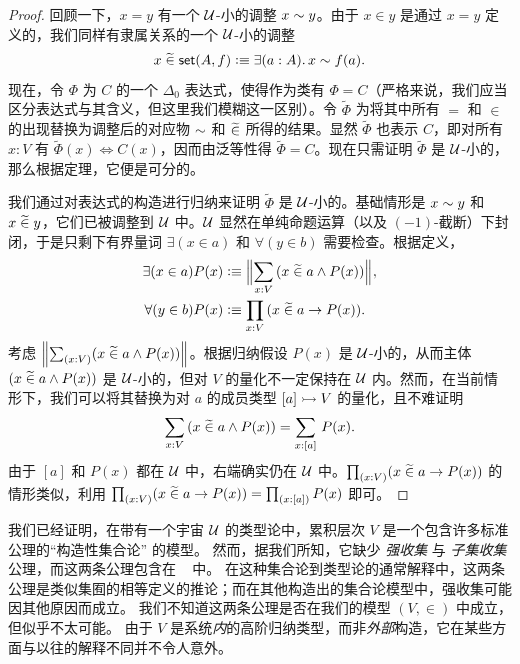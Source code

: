 \begin{proof}
回顾一下，$x = y$ 有一个 $\mathcal{U}$-小的调整 $x \sim y$。由于 $x\in y$ 是通过 $x=y$ 定义的，我们同样有隶属关系的一个 $\mathcal{U}$-小的调整
%
\begin{equation*}
  x\bin\vset(A,f) \defeq \exis{a:A} x \bisim f(a).
\end{equation*}
%
现在，令 $\Phi$ 为 $C$ 的一个 $\Delta_0$ 表达式，使得作为类有 $\Phi = C$（严格来说，我们应当区分表达式与其含义，但这里我们模糊这一区别）。令 $\widetilde{\Phi}$ 为将其中所有 $=$ 和 $\in$ 的出现替换为调整后的对应物 $\sim$ 和 $\mathrel{\widetilde{\in}}$ 所得的结果。显然 $\widetilde{\Phi}$ 也表示 $C$，即对所有 $x:V$ 有 $\widetilde{\Phi}(x) \Leftrightarrow C(x)$，因而由泛等性得 $\widetilde{\Phi}=C$。现在只需证明 $\widetilde{\Phi}$ 是 $\mathcal{U}$-小的，那么根据定理，它便是可分的。

我们通过对表达式的构造进行归纳来证明 $\widetilde{\Phi}$ 是 $\mathcal{U}$-小的。基础情形是 $x \sim y$ 和 $x\mathrel{\widetilde{\in}} y$，它们已被调整到 $\mathcal{U}$ 中。$\mathcal{U}$ 显然在单纯命题运算（以及 $(-1)$-截断）下封闭，于是只剩下有界量词 $\exists(x\in a)$ 和 $\forall(y\in b)$ 需要检查。根据定义，
\begin{align*}
\exists(x\in a) P(x) &\defeq \Brck {\sm{x:V}(x\bin a \land P(x))},\\
\forall(y\in b) P(x) &\defeq  \prd{x:V}(x\bin a \to P(x)).
\end{align*}
考虑 $\brck {\sm{x:V}(x\bin a \land P(x))}$。根据归纳假设 $P(x)$ 是 $\mathcal{U}$-小的，从而主体 $(x\mathrel{\widetilde{\in}} a \land P(x))$ 是 $\mathcal{U}$-小的，但对 $V$ 的量化不一定保持在 $\mathcal{U}$ 内。然而，在当前情形下，我们可以将其替换为对 $a$ 的成员类型 $[a]\rightarrowtail V$ 的量化，且不难证明
\begin{equation*}
  \sm{x:V}(x\bin a \land P(x)) = \sm{x:[a]} P(x).
\end{equation*}
由于 $[a]$ 和 $P(x)$ 都在 $\mathcal{U}$ 中，右端确实仍在 $\mathcal{U}$ 中。$\prd{x:V}(x\bin a \to P(x))$ 的情形类似，利用 $\prd{x:V}(x\bin a \to P(x)) = \prd{x:[a]}P(x)$ 即可。
\end{proof}

我们已经证明，在带有一个宇宙 $\mathcal{U}$ 的类型论中，累积层次 $V$ 是一个包含许多标准公理的``构造性集合论''
%
的模型。
然而，据我们所知，它缺少 \emph{强收集}
%
%
%
与 \emph{子集收集}
%
%
%
公理，而这两条公理包含在 \CZF{}~\cite{AczelCZF} 中。
在这种集合论到类型论的通常解释中，这两条公理是类似集囿的相等定义的推论；而在其他构造出的集合论模型中，强收集可能因其他原因而成立。
我们不知道这两条公理是否在我们的模型 $(V,\in)$ 中成立，但似乎不太可能。
由于 $V$ 是系统\emph{内}的高阶归纳类型，而非\emph{外部}构造，它在某些方面与以往的解释不同并不令人意外。


